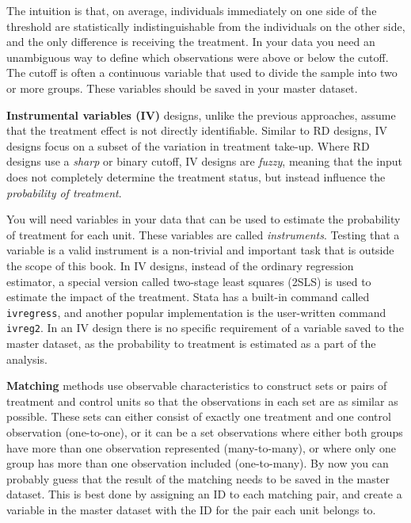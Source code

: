 The intuition is that, on average,
individuals immediately on one side of the threshold
are statistically indistinguishable from the individuals on the other side,
and the only difference is receiving the treatment.
In your data you need an unambiguous way
to define which observations were above or below the cutoff.
The cutoff is often a continuous variable 
that used to divide the sample into two or more groups. 
These variables should be saved in your master dataset.


\textbf{Instrumental variables (IV)}
designs, unlike the previous approaches,
assume that the treatment effect is not directly identifiable.
Similar to RD designs,
IV designs focus on a subset of the variation in treatment take-up.
Where RD designs use a \textit{sharp} or binary cutoff,
IV designs are \textit{fuzzy}, meaning that the input does not completely determine
the treatment status, but instead influence the \textit{probability of treatment}.

You will need variables in your data
that can be used to estimate the probability of treatment for each unit.
These variables are called \textit{instruments}.
Testing that a variable is a valid instrument is a non-trivial and important task
that is outside the scope of this book.
In IV designs, instead of the ordinary regression estimator,
a special version called two-stage least squares (2SLS) is used
to estimate the impact of the treatment.
Stata has a built-in command called \texttt{ivregress},
and another popular implementation is the user-written command \texttt{ivreg2}.
In an IV design there is no specific requirement of a variable saved
to the master dataset, 
as the probability to treatment is estimated as a part of the analysis.



\textbf{Matching}
methods use observable characteristics to construct
sets or pairs of treatment and control units
so that the observations in each set are as similar as possible. 
These sets can either consist of exactly one treatment and one control observation (one-to-one),
or it can be a set observations where either
both groups have more than one observation represented (many-to-many),
or where only one group has more than one observation included (one-to-many).
By now you can probably guess that the result of the matching needs to be saved in the master dataset.
This is best done by assigning an ID to each matching pair, 
and create a variable in the master dataset with the ID for the pair each unit belongs to.

